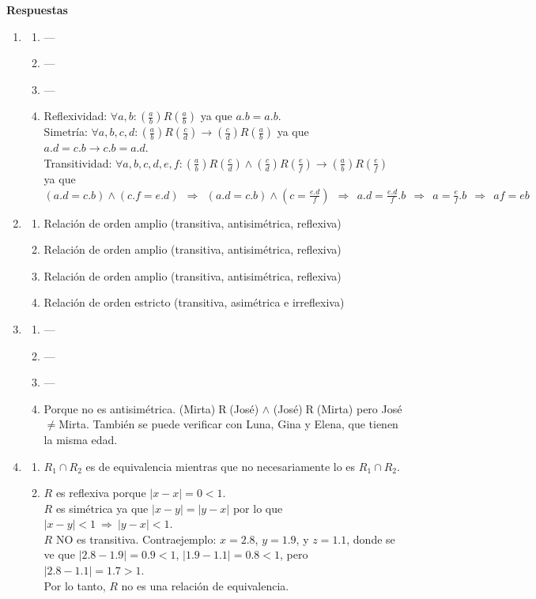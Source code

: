 \documentclass[a4paper]{article}
\newcommand{\exercise}{\item}
\newcommand{\Then}{\Rightarrow}
\begin{document}
 \textbf{Respuestas}\begin{enumerate}\exercise\begin{enumerate} [label=(\alph*)]\item ---\item ---\item ---		\item Reflexividad: $\forall a,b:  \left(\frac{a}{b}\right) R \left(\frac{a}{b}\right)$ ya que $a.b=a.b$. \\ Simetría: $\forall a,b,c,d: \left(\frac{a}{b}\right) R \left(\frac{c}{d}\right) \to \left(\frac{c}{d}\right) R \left(\frac{a}{b}\right)$ ya que $a.d=c.b \to c.b=a.d$. \\ Transitividad: $\forall a,b,c,d,e,f:  \left(\frac{a}{b}\right) R \left(\frac{c}{d}\right) \land \left(\frac{c}{d}\right) R \left(\frac{e}{f}\right) \to \left(\frac{a}{b}\right) R \left(\frac{e}{f}\right)$ \\ ya que $(a.d=c.b) \land (c.f=e.d) ~~\Then~~ (a.d=c.b) \land (c=\frac{e.d}{f}) ~~\Then~~ a.d=\frac{e.d}{f}.b ~~\Then~~ a=\frac{e}{f}.b ~~\Then~~ af=eb$
\end{enumerate}\exercise\begin{enumerate} [label=(\alph*)]		\item Relación de orden amplio (transitiva, antisimétrica, reflexiva) 
		\item Relación de orden amplio (transitiva, antisimétrica, reflexiva)
		\item Relación de orden amplio (transitiva, antisimétrica, reflexiva)
		\item Relación de orden estricto (transitiva, asimétrica e irreflexiva)
\end{enumerate}\exercise\begin{enumerate} [label=(\alph*)]\item ---\item ---\item ---		\item Porque no es antisimétrica. (Mirta)$\mathrel{R}$(José) $\land$ (José)$\mathrel{R}$(Mirta) pero José$\neq$Mirta. También se puede verificar con Luna, Gina y Elena, que tienen la misma edad.
\end{enumerate}\exercise\begin{enumerate} [label=(\alph*)]		\item $R_1 \cap R_2$ es de equivalencia mientras que no necesariamente lo es $R_1 \cap R_2$.
		\item $R$ es reflexiva porque $|x - x| = 0 < 1$. \\ $R$ es simétrica ya que $|x - y|=|y - x|$ por lo que $|x-y|<1 ~\Then~ |y - x| < 1$. \\ $R$ NO es transitiva. Contraejemplo: $x = 2.8$, $y = 1.9$, y $z = 1.1$, donde se ve que $|2.8-1.9|=0.9<1$, $|1.9-1.1|=0.8<1$, pero $|2.8-1.1|=1.7>1$. \\ Por lo tanto, $R$ no es una relación de equivalencia.

\end{enumerate}
\end{enumerate}
\end{document}
